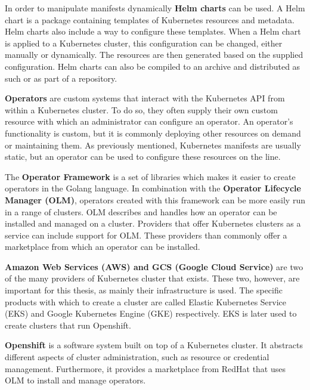 In order to manipulate manifests dynamically \textbf{Helm charts}\cite{helm-charts} can be used.
A Helm chart is a package containing templates of Kubernetes resources and metadata.
Helm charts also include a way to configure these templates.
When a Helm chart is applied to a Kubernetes cluster, this configuration can be changed, either manually or dynamically.
The resources are then generated based on the supplied configuration.
Helm charts can also be compiled to an archive and distributed as such or as part of a repository.

\textbf{Operators}\cite{kubernetes-operator} are custom systems that interact with the Kubernetes API from within a Kubernetes cluster.
To do so, they often supply their own custom resource with which an administrator can configure an operator.
An operator's functionality is custom, but it is commonly deploying other resources on demand or maintaining them.
As previously mentioned, Kubernetes manifests are usually static, but an operator can be used to configure these resources on the line.

The \textbf{Operator Framework}\cite{operator-framework, operator-lifecycle-manager} is a set of libraries which makes it easier to create operators in the Golang language.
In combination with the \textbf{Operator Lifecycle Manager (OLM)}\cite{operator-lifecycle-manager}, operators created with this framework can be more easily run in a range of clusters.
OLM describes and handles how an operator can be installed and managed on a cluster.
Providers that offer Kubernetes clusters as a service can include support for OLM.
These providers than commonly offer a marketplace from which an operator can be installed.

\textbf{Amazon Web Services (AWS) and GCS (Google Cloud Service)}\cite{eks,gke} are two of the many providers of Kubernetes cluster that exists.
These two, however, are important for this thesis, as mainly their infrastructure is used.
The specific products with which to create a cluster are called Elastic Kubernetes Service (EKS) and Google Kubernetes Engine (GKE) respectively.
EKS is later used to create clusters that run Openshift.

\textbf{Openshift}\cite{openshift} is a software system built on top of a Kubernetes cluster.
It abstracts different aspects of cluster administration, such as resource or credential management.
Furthermore, it provides a marketplace from RedHat that uses OLM to install and manage operators.


